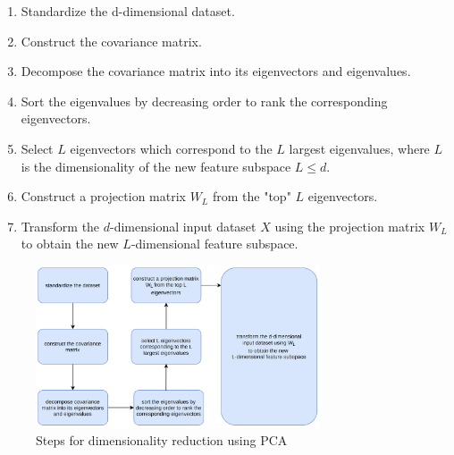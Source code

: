 \begin{enumerate}
    \item Standardize the d-dimensional dataset.
    \item Construct the covariance matrix.
    \item Decompose the covariance matrix into its eigenvectors and eigenvalues.
    \item Sort the eigenvalues by decreasing order to rank the corresponding eigenvectors.
    \item Select $L$ eigenvectors which correspond to the $L$ largest eigenvalues, where $L$ is the dimensionality of the new feature subspace $L \leq d$.
    \item Construct a projection matrix $W_L$ from the "top" $L$ eigenvectors.
    \item Transform the $d$-dimensional input dataset $X$ using the projection matrix $W_L$ to obtain the new $L$-dimensional feature subspace.
\end{enumerate}


\begin{figure}[!ht]
    \centering
    \includegraphics[width=0.75\textwidth]{fig/2-3.png}
    \caption{Steps for dimensionality reduction using PCA}
    \label{fig:dimensionalityReductionSteps}
\end{figure}